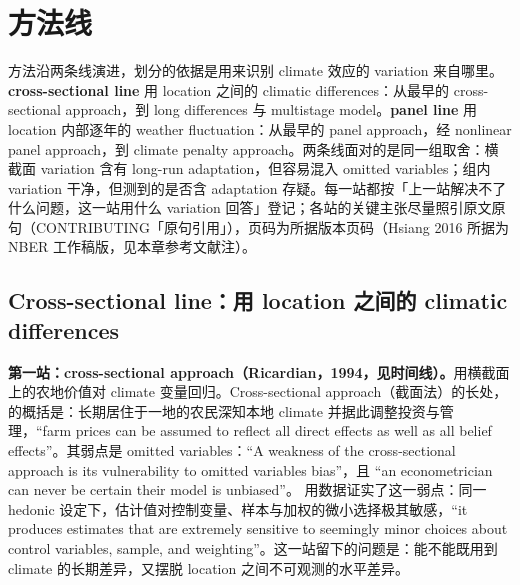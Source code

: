 \section{方法线}

方法沿两条线演进，划分的依据是用来识别 climate 效应的 variation 来自哪里。\textbf{cross-sectional line} 用 location 之间的 climatic differences：从最早的 cross-sectional approach，到 long differences 与 multistage model。\textbf{panel line} 用 location 内部逐年的 weather fluctuation：从最早的 panel approach，经 nonlinear panel approach，到 climate penalty approach。两条线面对的是同一组取舍：横截面 variation 含有 long-run adaptation，但容易混入 omitted variables；组内 variation 干净，但测到的是否含 adaptation 存疑。每一站都按「上一站解决不了什么问题，这一站用什么 variation 回答」登记；各站的关键主张尽量照引原文原句（CONTRIBUTING「原句引用」），页码为所据版本页码（Hsiang 2016 所据为 NBER 工作稿版，见本章参考文献注）。

\subsection{Cross-sectional line：用 location 之间的 climatic differences}

\textbf{第一站：cross-sectional approach（Ricardian，1994，见时间线）。}用横截面上的农地价值对 climate 变量回归。Cross-sectional approach（截面法）的长处，\citet{hsiang2016climate} 的概括是：长期居住于一地的农民深知本地 climate 并据此调整投资与管理，``farm prices can be assumed to reflect all direct effects as well as all belief effects''\citep[第~5 页；direct effects（直接效应）指 climate 经由 weather 实现的直接影响，belief effects（信念效应）指主体因相信本地 climate 如此而做的调整，即 adaptation 行为，区分随 Hsiang 2016]{hsiang2016climate}。其弱点是 omitted variables：``A weakness of the cross-sectional approach is its vulnerability to omitted variables bias''\citep[第~5 页]{hsiang2016climate}，且 ``an econometrician can never be certain their model is unbiased''\citep[第~5 页]{hsiang2016climate}。\citet{deschenes2007economic} 用数据证实了这一弱点：同一 hedonic 设定下，估计值对控制变量、样本与加权的微小选择极其敏感，``it produces estimates that are extremely sensitive to seemingly minor choices about control variables, sample, and weighting''\citep[第~354 页]{deschenes2007economic}。这一站留下的问题是：能不能既用到 climate 的长期差异，又摆脱 location 之间不可观测的水平差异。

